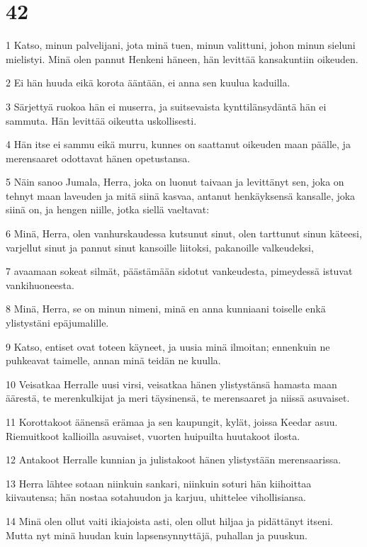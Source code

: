 \chapter{42}

\par 1 Katso, minun palvelijani, jota minä tuen, minun valittuni, johon minun sieluni mielistyi. Minä olen pannut Henkeni häneen, hän levittää kansakuntiin oikeuden.
\par 2 Ei hän huuda eikä korota ääntään, ei anna sen kuulua kaduilla.
\par 3 Särjettyä ruokoa hän ei muserra, ja suitsevaista kynttilänsydäntä hän ei sammuta. Hän levittää oikeutta uskollisesti.
\par 4 Hän itse ei sammu eikä murru, kunnes on saattanut oikeuden maan päälle, ja merensaaret odottavat hänen opetustansa.
\par 5 Näin sanoo Jumala, Herra, joka on luonut taivaan ja levittänyt sen, joka on tehnyt maan laveuden ja mitä siinä kasvaa, antanut henkäyksensä kansalle, joka siinä on, ja hengen niille, jotka siellä vaeltavat:
\par 6 Minä, Herra, olen vanhurskaudessa kutsunut sinut, olen tarttunut sinun käteesi, varjellut sinut ja pannut sinut kansoille liitoksi, pakanoille valkeudeksi,
\par 7 avaamaan sokeat silmät, päästämään sidotut vankeudesta, pimeydessä istuvat vankihuoneesta.
\par 8 Minä, Herra, se on minun nimeni, minä en anna kunniaani toiselle enkä ylistystäni epäjumalille.
\par 9 Katso, entiset ovat toteen käyneet, ja uusia minä ilmoitan; ennenkuin ne puhkeavat taimelle, annan minä teidän ne kuulla.
\par 10 Veisatkaa Herralle uusi virsi, veisatkaa hänen ylistystänsä hamasta maan äärestä, te merenkulkijat ja meri täysinensä, te merensaaret ja niissä asuvaiset.
\par 11 Korottakoot äänensä erämaa ja sen kaupungit, kylät, joissa Keedar asuu. Riemuitkoot kallioilla asuvaiset, vuorten huipuilta huutakoot ilosta.
\par 12 Antakoot Herralle kunnian ja julistakoot hänen ylistystään merensaarissa.
\par 13 Herra lähtee sotaan niinkuin sankari, niinkuin soturi hän kiihoittaa kiivautensa; hän nostaa sotahuudon ja karjuu, uhittelee vihollisiansa.
\par 14 Minä olen ollut vaiti ikiajoista asti, olen ollut hiljaa ja pidättänyt itseni. Mutta nyt minä huudan kuin lapsensynnyttäjä, puhallan ja puuskun.
